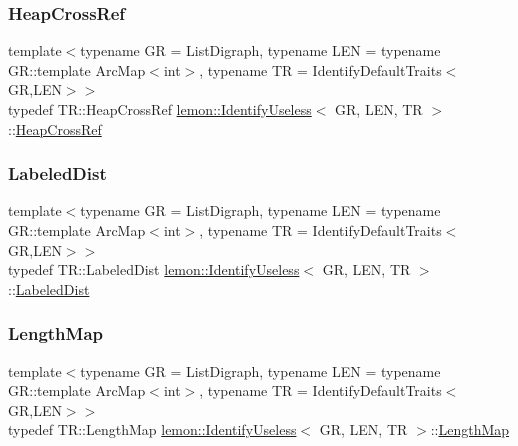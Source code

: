 \subsubsection{\texorpdfstring{Heap\+Cross\+Ref}{HeapCrossRef}}
{\footnotesize\ttfamily template$<$typename GR  = List\+Digraph, typename L\+EN  = typename G\+R\+::template Arc\+Map$<$int$>$, typename TR  = Identify\+Default\+Traits$<$\+G\+R,\+L\+E\+N$>$$>$ \\
typedef T\+R\+::\+Heap\+Cross\+Ref \hyperlink{classlemon_1_1_identify_useless}{lemon\+::\+Identify\+Useless}$<$ GR, L\+EN, TR $>$\+::\hyperlink{classlemon_1_1_identify_useless_a8028f36ab31388d786049d08dfce2453}{Heap\+Cross\+Ref}}

\mbox{\label{classlemon_1_1_identify_useless_ad44b00c430e4b58280c0399b4a02de4d}} 
\subsubsection{\texorpdfstring{Labeled\+Dist}{LabeledDist}}
{\footnotesize\ttfamily template$<$typename GR  = List\+Digraph, typename L\+EN  = typename G\+R\+::template Arc\+Map$<$int$>$, typename TR  = Identify\+Default\+Traits$<$\+G\+R,\+L\+E\+N$>$$>$ \\
typedef T\+R\+::\+Labeled\+Dist \hyperlink{classlemon_1_1_identify_useless}{lemon\+::\+Identify\+Useless}$<$ GR, L\+EN, TR $>$\+::\hyperlink{classlemon_1_1_identify_useless_ad44b00c430e4b58280c0399b4a02de4d}{Labeled\+Dist}}

\mbox{\label{classlemon_1_1_identify_useless_a47fb50fbfa981adae466fc6e71436fee}} 
\subsubsection{\texorpdfstring{Length\+Map}{LengthMap}}
{\footnotesize\ttfamily template$<$typename GR  = List\+Digraph, typename L\+EN  = typename G\+R\+::template Arc\+Map$<$int$>$, typename TR  = Identify\+Default\+Traits$<$\+G\+R,\+L\+E\+N$>$$>$ \\
typedef T\+R\+::\+Length\+Map \hyperlink{classlemon_1_1_identify_useless}{lemon\+::\+Identify\+Useless}$<$ GR, L\+EN, TR $>$\+::\hyperlink{classlemon_1_1_identify_useless_a47fb50fbfa981adae466fc6e71436fee}{Length\+Map}}

